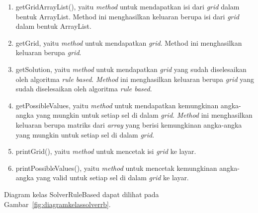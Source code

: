 \begin{enumerate}
\item getGridArrayList(), yaitu \textit{method} untuk mendapatkan isi dari \textit{grid} dalam bentuk ArrayList. Method ini menghasilkan keluaran berupa isi dari \textit{grid} dalam bentuk ArrayList.
\item getGrid, yaitu \textit{method} untuk mendapatkan \textit{grid}. Method ini menghasilkan keluaran berupa \textit{grid}.
\item getSolution, yaitu \textit{method} untuk mendapatkan \textit{grid} yang sudah diselesaikan oleh algoritma \textit{rule based}. \textit{Method} ini menghasilkan keluaran berupa \textit{grid} yang sudah diselesaikan oleh algoritma \textit{rule based}.
\item getPossibleValues, yaitu \textit{method} untuk mendapatkan kemungkinan angka-angka yang mungkin untuk setiap sel di dalam \textit{grid}. \textit{Method} ini menghasilkan keluaran berupa matriks dari \textit{array} yang berisi kemungkinan angka-angka yang mungkin untuk setiap sel di dalam \textit{grid}.
\item printGrid(), yaitu \textit{method} untuk mencetak isi \textit{grid} ke layar.
\item printPossibleValues(), yaitu \textit{method} untuk mencetak kemungkinan angka-angka yang valid untuk setiap sel di dalam \textit{grid} ke layar.
\end{enumerate}

Diagram kelas SolverRuleBased dapat dilihat pada Gambar~\ref{fig:diagramkelassolverrb}.

